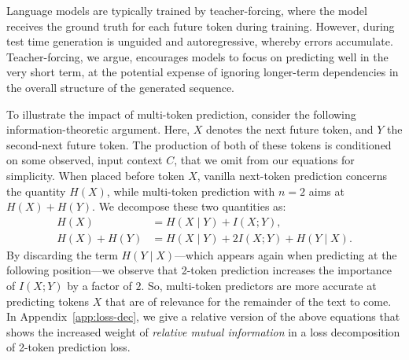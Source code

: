 Language models are typically trained by teacher-forcing, where the model receives the ground truth for each future token during training. 
However, during test time generation is unguided and autoregressive, whereby errors accumulate.
Teacher-forcing, we argue, encourages models to focus on predicting well in the very short term, at the potential expense of ignoring longer-term dependencies in the overall structure of the generated sequence.


To illustrate the impact of multi-token prediction, consider the following information-theoretic argument.
Here, $X$ denotes the next future token, and $Y$ the second-next future token.
The production of both of these tokens is conditioned on some observed, input context $C$, that we omit from our equations for simplicity.
When placed before token $X$, vanilla next-token prediction concerns the quantity $H(X)$, while multi-token prediction with $n=2$ aims at $H(X) + H(Y)$.
We decompose these two quantities as:
\begin{align*}
  H(X)        &= H(X \mid Y) +   I(X; Y),\\
  H(X) + H(Y) &= H(X \mid Y) + 2 I(X; Y) + H(Y \mid X).
\end{align*}
By discarding the term $H(Y \mid X)$---which appears again when predicting at the following position---we observe that 2-token prediction increases the importance of $I(X; Y)$ by a factor of $2$.
So, multi-token predictors are more accurate at predicting tokens $X$ that are of relevance for the remainder of the text to come. In Appendix~\ref{app:loss-dec}, we give a relative version of the above equations that shows the increased weight of \emph{relative mutual information} in a loss decomposition of 2-token prediction loss.










